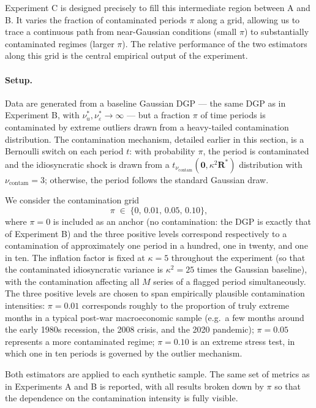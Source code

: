 \documentclass[11pt, a4paper, oneside]{article}
\newcommand{\mR}{\mathbf{R}}
\begin{document}
Experiment C is designed precisely to fill this intermediate
region between A and B. It varies the fraction of contaminated
periods $\pi$ along a grid, allowing us to trace a continuous
path from near-Gaussian conditions (small $\pi$) to substantially
contaminated regimes (larger $\pi$). The relative performance of
the two estimators along this grid is the central empirical
output of the experiment.

\paragraph{Setup.}
Data are generated from a baseline Gaussian DGP — the same DGP as
in Experiment B, with $\nu_u^*, \nu_\varepsilon^* \to \infty$ — but
a fraction $\pi$ of time periods is contaminated by extreme
outliers drawn from a heavy-tailed contamination distribution.
The contamination mechanism, detailed earlier in this section, is
a Bernoulli switch on each period $t$: with probability $\pi$,
the period is contaminated and the idiosyncratic shock is drawn
from a $t_{\nu_{\mathrm{contam}}}(\mathbf{0}, \kappa^2 \mR^*)$
distribution with $\nu_{\mathrm{contam}} = 3$; otherwise, the
period follows the standard Gaussian draw.

We consider the contamination grid
\[
\pi \;\in\; \{0,\, 0.01,\, 0.05,\, 0.10\},
\]
where $\pi = 0$ is included as an anchor (no contamination: the
DGP is exactly that of Experiment B) and the three positive
levels correspond respectively to a contamination of approximately
one period in a hundred, one in twenty, and one in ten. The
inflation factor is fixed at $\kappa = 5$ throughout the
experiment (so that the contaminated idiosyncratic variance is
$\kappa^2 = 25$ times the Gaussian baseline), with the
contamination affecting all $M$ series of a flagged period
simultaneously. The three positive
levels are chosen to span empirically plausible contamination
intensities: $\pi = 0.01$ corresponds roughly to the proportion of
truly extreme months in a typical post-war macroeconomic sample
(e.g.\ a few months around the early 1980s recession, the 2008
crisis, and the 2020 pandemic); $\pi = 0.05$ represents a more
contaminated regime; $\pi = 0.10$ is an extreme stress test, in
which one in ten periods is governed by the outlier mechanism.

Both estimators are applied to each synthetic sample. The same
set of metrics as in Experiments A and B is reported, with all
results broken down by $\pi$ so that the dependence on the
contamination intensity is fully visible.
\end{document}
